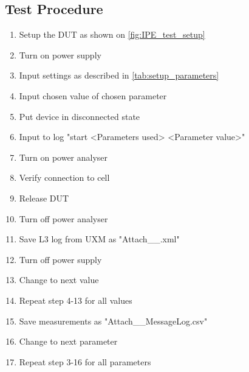 \subsection{Test Procedure}
\begin{enumerate}
\item Setup the \gls{DUT} as shown on \autoref{fig:IPE_test_setup}
\item Turn on power supply 
\item Input settings as described in \autoref{tab:setup_parameters}
\item Input chosen value of chosen parameter
\item Put device in disconnected state 
\item Input to log "start <Parameters used> <Parameter value>"
\item Turn on power analyser
\item Verify connection to cell
\item Release DUT
\item Turn off power analyser
\item Save L3 log from UXM as "Attach\_<Parameters used>\_<Parameters value>.xml"
\item Turn off power supply
\item Change to next value
\item Repeat step 4-13 for all values
\item Save measurements as "Attach\_<Parameters used>\_MessageLog.csv"
\item Change to next parameter
\item Repeat step 3-16 for all parameters
\end{enumerate}


